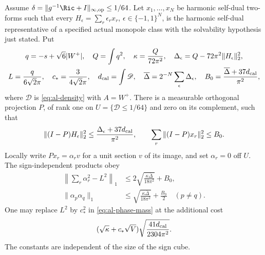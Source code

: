 \begin{lemma}
\label{lem:al-global-phase}
Assume $\delta=\|g^{-1}\Ric+I\|_{\infty,\mathrm{op}}\le1/64$.
Let $x_1,\ldots,x_N$ be harmonic self-dual two-forms such that every
$H_\epsilon=\sum_r\epsilon_rx_r$, $\epsilon\in\{-1,1\}^N$, is the
harmonic self-dual representative of a specified actual monopole class
with the solvability hypothesis just stated.  Put
\[
 \begin{gathered}
 q=-s+\sqrt6|W^+|,\quad
 Q=\int q^2,\quad \kappa=\frac{Q}{72\pi^2},\quad
 \Delta_\epsilon=Q-72\pi^2\|H_\epsilon\|_2^2,\\
 L=\frac{q}{6\sqrt2\pi},\quad c_* =\frac3{4\sqrt2\pi},\quad
 d_{\rm cal}=\int\mathscr D,\quad
 \overline\Delta=2^{-N}\sum_\epsilon\Delta_\epsilon,\quad
 B_0=\frac{\overline\Delta+37d_{\rm cal}}{\pi^2},
 \end{gathered}
\]
where $\mathscr D$ is \eqref{eq:al-density} with $A=W^+$.
There is a measurable orthogonal projection $P$, of rank one on
$U=\{\mathscr D\le1/64\}$ and zero on its complement, such that
\begin{equation}\label{eq:al-global-projection}
 \|(I-P)H_\epsilon\|_2^2
 \le\frac{\Delta_\epsilon+37d_{\rm cal}}{\pi^2},
 \qquad \sum_r\|(I-P)x_r\|_2^2\le B_0.
\end{equation}
Locally write $Px_r=\alpha_rv$ for a unit section $v$ of its image, and
set $\alpha_r=0$ off $U$.  The sign-independent products obey
\begin{align}
 \left\|\sum_r\alpha_r^2-L^2\right\|_1
 &\le2\sqrt{\frac{\kappa\overline\Delta}{18\pi^2}}+B_0,
 \label{eq:al-phase-mass}\\
 \|\alpha_p\alpha_q\|_1
 &\le\sqrt{\frac{\kappa\overline\Delta}{18\pi^2}}+\frac{B_0}{2}
 \quad(p\ne q).
 \label{eq:al-phase-products}
\end{align}
One may replace $L^2$ by $c_*^2$ in \eqref{eq:al-phase-mass} at the
additional cost
\begin{equation}\label{eq:al-constant-phase-target}
 (\sqrt\kappa+c_*\sqrt V)
       \sqrt{\frac{41d_{\rm cal}}{2304\pi^2}}.
\end{equation}
The constants are independent of the size of the sign cube.
\end{lemma}

